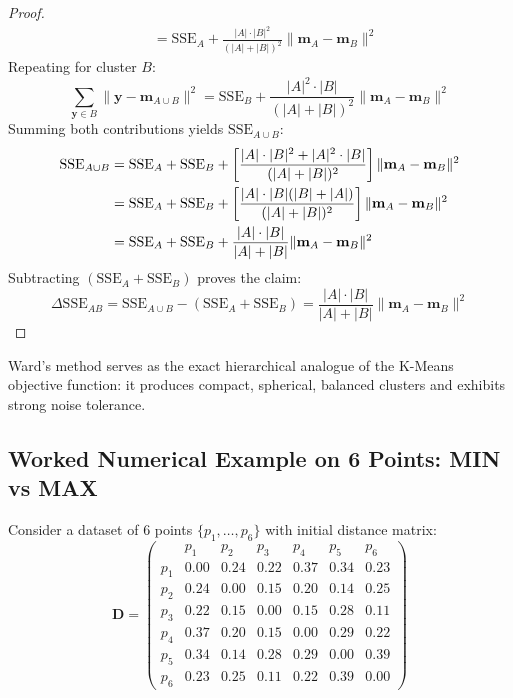 \begin{proof}
\begin{align}
    &= \mathrm{SSE}_A + \frac{|A| \cdot |B|^2}{(|A| + |B|)^2} \|\mathbf{m}_A - \mathbf{m}_B\|^2
\end{align}
Repeating for cluster $B$:
\begin{equation}
    \sum_{\mathbf{y} \in B} \|\mathbf{y} - \mathbf{m}_{A \cup B}\|^2 = \mathrm{SSE}_B + \frac{|A|^2 \cdot |B|}{(|A| + |B|)^2} \|\mathbf{m}_A - \mathbf{m}_B\|^2
\end{equation}
Summing both contributions yields $\mathrm{SSE}_{A \cup B}$:
\begin{align}
    \mathrm{SSE}_{A \cup B} &= \mathrm{SSE}_A + \mathrm{SSE}_B + \left[ \frac{|A| \cdot |B|^2 + |A|^2 \cdot |B|}{(|A| + |B|)^2} \right] \|\mathbf{m}_A - \mathbf{m}_B\|^2 \notag \\
    &= \mathrm{SSE}_A + \mathrm{SSE}_B + \left[ \frac{|A| \cdot |B| (|B| + |A|)}{(|A| + |B|)^2} \right] \|\mathbf{m}_A - \mathbf{m}_B\|^2 \notag \\
    &= \mathrm{SSE}_A + \mathrm{SSE}_B + \frac{|A| \cdot |B|}{|A| + |B|} \|\mathbf{m}_A - \mathbf{m}_B\|^2
\end{align}
Subtracting $(\mathrm{SSE}_A + \mathrm{SSE}_B)$ proves the claim:
\begin{equation}
    \Delta \mathrm{SSE}_{AB} = \mathrm{SSE}_{A \cup B} - (\mathrm{SSE}_A + \mathrm{SSE}_B) = \frac{|A| \cdot |B|}{|A| + |B|} \|\mathbf{m}_A - \mathbf{m}_B\|^2
\end{equation}
\end{proof}

Ward's method serves as the exact hierarchical analogue of the K-Means objective function: it produces compact, spherical, balanced clusters and exhibits strong noise tolerance.

\subsection{Worked Numerical Example on 6 Points: MIN vs MAX}

Consider a dataset of 6 points $\{p_1, \dots, p_6\}$ with initial distance matrix:
\begin{equation}
\mathbf{D} = 
\begin{pmatrix}
 & p_1 & p_2 & p_3 & p_4 & p_5 & p_6 \\
p_1 & 0.00 & 0.24 & 0.22 & 0.37 & 0.34 & 0.23 \\
p_2 & 0.24 & 0.00 & 0.15 & 0.20 & 0.14 & 0.25 \\
p_3 & 0.22 & 0.15 & 0.00 & 0.15 & 0.28 & 0.11 \\
p_4 & 0.37 & 0.20 & 0.15 & 0.00 & 0.29 & 0.22 \\
p_5 & 0.34 & 0.14 & 0.28 & 0.29 & 0.00 & 0.39 \\
p_6 & 0.23 & 0.25 & 0.11 & 0.22 & 0.39 & 0.00
\end{pmatrix}
\end{equation}

